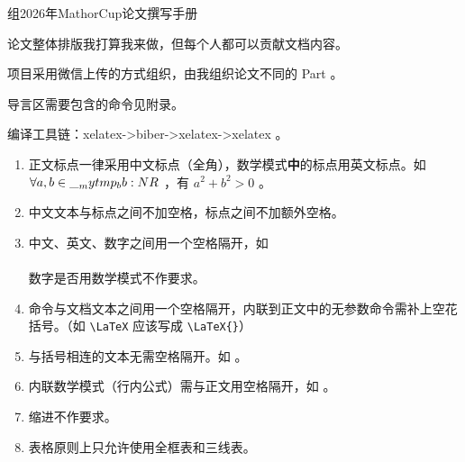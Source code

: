 \documentclass{MMCStyle}
\begin{document}
\begin{center}
\LARGE{} 组2026年MathorCup论文撰写手册\bigskip
\end{center}

论文整体排版我打算我来做，但每个人都可以贡献文档内容。

项目采用微信上传的方式组织，由我组织论文不同的 Part 。

导言区需要包含的命令见附录。

编译工具链：xelatex->biber->xelatex->xelatex 。



\begin{enumerate}
    \item 正文标点一律采用中文标点（全角），数学模式\textbf{中}的标点用英文标点。如\\
      $\forall a, b \in\__mytmp_bb:N R$ ，有 $a^2 + b^2 > 0$ 。
    \item 中文文本与标点之间不加空格，标点之间不加额外空格。
    \item 中文、英文、数字之间用一个空格隔开，如\\
      \\
      数字是否用数学模式不作要求。
    \item 命令与文档文本之间用一个空格隔开，内联到正文中的无参数命令需补上空花括号。（如 \verb|\LaTeX| 应该写成 \verb|\LaTeX{}|）
    \item 与括号相连的文本无需空格隔开。如  。
    \item 内联数学模式（行内公式）需与正文用空格隔开，如  。
    \item 缩进不作要求。
    \item 表格原则上只允许使用全框表和三线表。
\end{enumerate}


\end{document}
